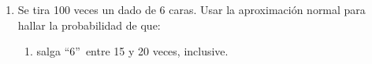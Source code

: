 \documentclass[a4paper, 11pt]{article}
\begin{document}
\begin{enumerate}
%
%
%


\item Se tira 100 veces un dado de 6 caras. Usar la aproximación normal
para hallar la probabilidad de que:


\begin{enumerate}
\item salga \textquotedblleft6\textquotedblright\ entre 15 y 20 veces, inclusive.



\end{enumerate}
\end{enumerate}
\end{document}
